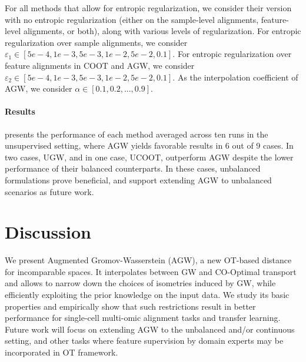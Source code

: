 For all methods that allow for entropic regularization,
we consider their version with no entropic regularization (either on the sample-level alignments,
feature-level alignments, or both), along with various levels of regularization.
For entropic regularization over sample alignments, we consider
$\varepsilon_1 \in [ 5e-4, 1e-3, 5e-3, 1e-2, 5e-2, 0.1] $. For entropic regularization over
feature alignments in COOT and AGW, we consider $\varepsilon_2 \in [ 5e-4, 1e-3, 5e-3, 1e-2, 5e-2, 0.1]$.
As the interpolation coefficient of AGW, we consider $\alpha \in [ 0.1, 0.2, ..., 0.9]$.

\paragraph{Results}  presents the performance of each method averaged across
ten runs in the unsupervised setting, where AGW yields favorable results in 6 out of 9 cases.
In two cases, UGW, and in one case, UCOOT, outperform AGW despite the lower performance of
their balanced counterparts. In these cases, unbalanced formulations prove beneficial,
and support extending AGW to unbalanced scenarios as future work.

\section{Discussion}

We present Augmented Gromov-Wasserstein (AGW), a new OT-based distance for incomparable spaces.
It interpolates between GW and CO-Optimal transport and allows to narrow down the
choices of isometries induced by GW, while efficiently exploiting the prior knowledge
on the input data. We study its basic properties and empirically show that such restrictions
result in better performance for single-cell multi-omic alignment tasks and transfer learning.
Future work will focus on extending AGW to the unbalanced
and/or continuous setting, and other tasks where feature supervision by domain experts
may be incorporated in OT framework.

\vfill